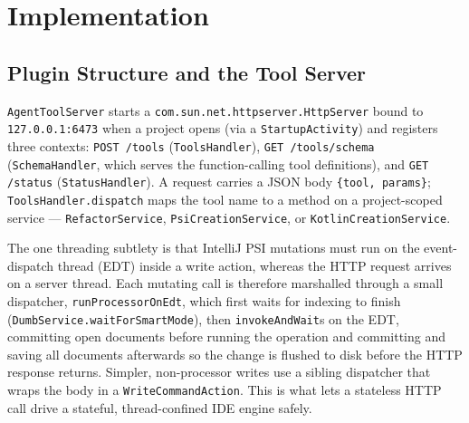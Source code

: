 \chapter{Implementation}
\label{ch:impl}

\section{Plugin Structure and the Tool Server}
\label{sec:impl-server}
\texttt{AgentToolServer} starts a \texttt{com.sun.net.httpserver.HttpServer} bound to
\texttt{127.0.0.1:6473} when a project opens (via a \texttt{StartupActivity}) and
registers three contexts: \texttt{POST /tools} (\texttt{ToolsHandler}),
\texttt{GET /tools/schema} (\texttt{SchemaHandler}, which serves the function-calling
tool definitions), and \texttt{GET /status} (\texttt{StatusHandler}). A request carries
a JSON body \texttt{\{tool, params\}}; \texttt{ToolsHandler.dispatch} maps the tool name
to a method on a project-scoped service --- \texttt{RefactorService},
\texttt{PsiCreationService}, or \texttt{KotlinCreationService}.

The one threading subtlety is that IntelliJ PSI mutations must run on the
event-dispatch thread (EDT) inside a write action, whereas the HTTP request arrives on
a server thread. Each mutating call is therefore marshalled through a small dispatcher,
\texttt{runProcessorOnEdt}, which first waits for indexing to finish
(\texttt{DumbService.waitForSmartMode}), then \texttt{invokeAndWait}s on the EDT,
committing open documents before running the operation and committing and saving all
documents afterwards so the change is flushed to disk before the HTTP response returns.
Simpler, non-processor writes use a sibling dispatcher that wraps the body in a
\texttt{WriteCommandAction}. This is what lets a stateless HTTP call drive a stateful,
thread-confined IDE engine safely.

